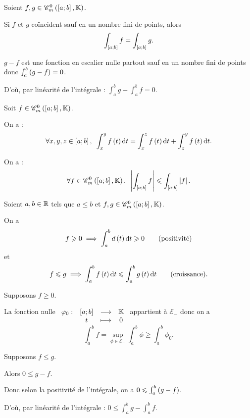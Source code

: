\begin{rem}
Soient \(f,g\in\contm\).

Si \(f\) et \(g\) coïncident sauf en un nombre fini de points, alors \[\int_{\left[a;b\right]}f=\int_{\left[a;b\right]}g.\]
\end{rem}

\begin{dem}
\(g-f\) est une fonction en escalier nulle partout sauf en un nombre fini de points donc \(\int_a^b\left(g-f\right)=0\).

D'où, par linéarité de l'intégrale : \(\int_a^bg-\int_a^bf=0\).
\end{dem}

\begin{prop}
Soit \(f\in\contm\).

On a : \[\quantifs{\forall x,y,z\in\intervii{a}{b}}\int_x^yf\paren{t}\odif{t}=\int_x^zf\paren{t}\odif{t}+\int_z^yf\paren{t}\odif{t}.\]
\end{prop}

\begin{prop}
On a : \[\quantifs{\forall f\in\contm}\abs{\int_{\intervii{a}{b}}f}\leq\int_{\intervii{a}{b}}\abs{f}.\]
\end{prop}

\begin{prop}
Soient \(a,b\in\mathbb{R}\) tels que \(a\leq b\) et \(f,g\in\contm\).

On a \[f\geq0\imp\int_a^bd\paren{t}\odif{t}\geq0\qquad\text{(positivité)}\] et \[f\leq g\imp\int_a^bf\paren{t}\odif{t}\leq\int_a^bg\paren{t}\odif{t}\qquad\text{(croissance)}.\]
\end{prop}

\begin{dem}[Positivité]
\newcommand{\Em}{\mathcal{E}_-}
Supposons \(f\geq0\).

La fonction nulle \(\begin{array}[t]{cccc}\varphi_0 : & \left[a;b\right] & \longrightarrow & \mathbb{K} \\ & t & \longmapsto & 0\end{array}\) appartient à \(\Em\) donc on a \[\int_a^bf=\sup_{\phi\in\Em}\int_a^b\phi\geq\int_a^b\phi_0.\]
\end{dem}

\begin{dem}[Croissance]
Supposons \(f\leq g\).

Alors \(0\leq g-f\).

Donc selon la positivité de l'intégrale, on a \(0\leqslant\int_a^b\left(g-f\right)\).

D'où, par linéarité de l'intégrale : \(0\leq\int_a^bg-\int_a^bf\).
\end{dem}


